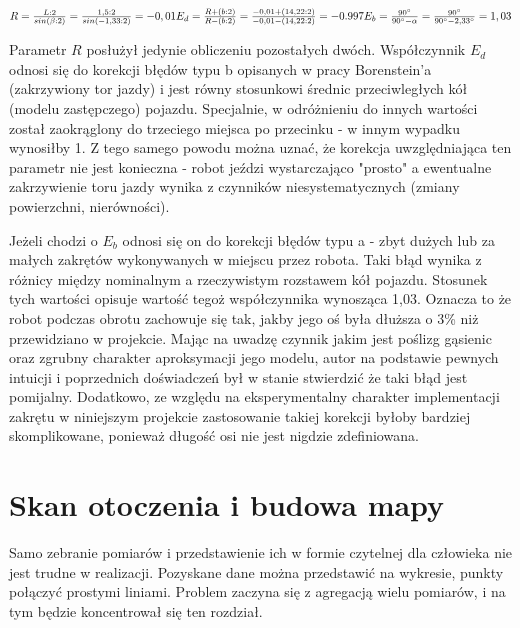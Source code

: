 \begin{center}
    $
    R = \frac{L : 2}{sin(\beta : 2)} = \frac{1,5 : 2}{sin(-1,33 : 2)} = -0,01 \\[5pt]
    E_{d} = \frac{R + (b : 2)}{R - (b : 2)} = \frac{-0,01 + (14,22 : 2)}{-0,01 - (14,22 : 2)} = -0.997 \\[5pt]
    E_{b} = \frac{90^{\circ}}{90^{\circ} - \alpha} = \frac{90^{\circ}}{90^{\circ} - 2,33^{\circ}} = 1,03
    $
\end{center}


Parametr $R$ posłużył jedynie obliczeniu pozostałych dwóch. Współczynnik $E_{d}$ odnosi się do korekcji błędów typu b opisanych w pracy Borenstein'a (zakrzywiony tor jazdy) i jest równy stosunkowi średnic przeciwległych kół (modelu zastępczego) pojazdu. Specjalnie, w odróżnieniu do innych wartości został zaokrąglony do trzeciego miejsca po przecinku - w innym wypadku wynosiłby 1. Z tego samego powodu można uznać, że korekcja uwzględniająca ten parametr nie jest konieczna - robot jeździ wystarczająco "prosto" a ewentualne zakrzywienie toru jazdy wynika z czynników niesystematycznych (zmiany powierzchni, nierówności).

Jeżeli chodzi o $E_{b}$ odnosi się on do korekcji błędów typu a - zbyt dużych lub za małych zakrętów wykonywanych w miejscu przez robota. Taki błąd wynika z różnicy między nominalnym a rzeczywistym rozstawem kół pojazdu. Stosunek tych wartości opisuje wartość tegoż współczynnika wynosząca 1,03. Oznacza to że robot podczas obrotu zachowuje się tak, jakby jego oś była dłuższa o 3\% niż przewidziano w projekcie. Mając na uwadzę czynnik jakim jest poślizg gąsienic oraz zgrubny charakter aproksymacji jego modelu, autor na podstawie pewnych intuicji i poprzednich doświadczeń był w stanie stwierdzić że taki błąd jest pomijalny. Dodatkowo, ze względu na eksperymentalny charakter implementacji zakrętu w niniejszym projekcie zastosowanie takiej korekcji byłoby bardziej skomplikowane, ponieważ długość osi nie jest nigdzie zdefiniowana.

\section{Skan otoczenia i budowa mapy}
\label{sec:scan}
Samo zebranie pomiarów i przedstawienie ich w formie czytelnej dla człowieka nie jest trudne w realizacji. Pozyskane dane można przedstawić na wykresie, punkty połączyć prostymi liniami. Problem zaczyna się z agregacją wielu pomiarów, i na tym będzie koncentrował się ten rozdział.

